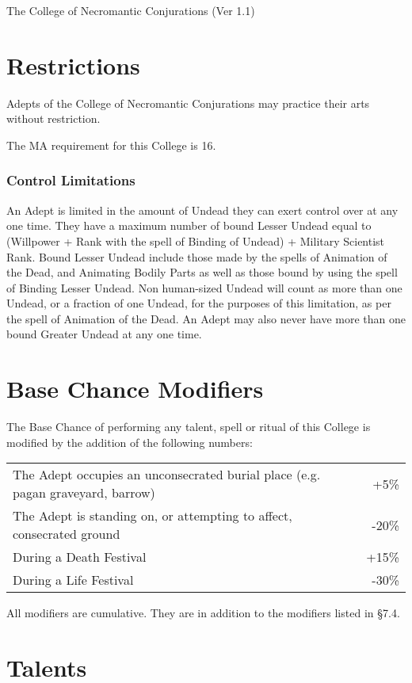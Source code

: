 \begin{Chapter}{The College of Necromantic Conjurations (Ver 1.1)}
\section{Restrictions}

Adepts of the College of Necromantic Conjurations may practice their
arts without restriction.

The MA requirement for this College is 16. 

\subsubsection{Control Limitations}

An Adept is limited in the amount of Undead they can exert control
over at any one time. They have a maximum number of bound Lesser
Undead equal to (Willpower + Rank with the spell of Binding of Undead)
+ Military Scientist Rank.  Bound Lesser Undead include those made by
the spells of Animation of the Dead, and Animating Bodily Parts as
well as those bound by using the spell of Binding Lesser Undead.  Non
human-sized Undead will count as more than one Undead, or a fraction
of one Undead, for the purposes of this limitation, as per the spell
of Animation of the Dead.  An Adept may also never have more than one
bound Greater Undead at any one time.

\section{Base Chance Modifiers}

The Base Chance of performing any talent, spell or ritual of this
College is modified by the addition of the following numbers:

\begin{tabularx}{\columnwidth}{Xr}
The Adept occupies an unconsecrated burial place (e.g. pagan graveyard, barrow) & +5\%  \\
The Adept is standing on, or attempting to affect, consecrated ground & -20\% \\
During a Death Festival  & +15\% \\
During a Life Festival & -30\% \\
\end{tabularx}

All modifiers are cumulative.  They are in addition to the modifiers
listed in §7.4.

\section{Talents}


\end{Chapter}
